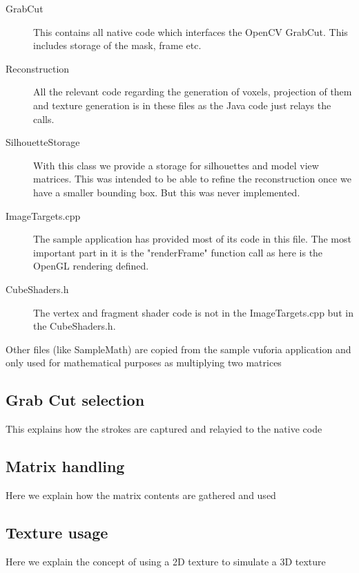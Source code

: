 \documentclass[10pt,twocolumn,letterpaper]{article}
\begin{document}
\begin{description}
	\item[GrabCut] This contains all native code which interfaces the OpenCV GrabCut. This includes storage of the mask, frame etc.
	\item[Reconstruction] All the relevant code regarding the generation of voxels, projection of them and texture generation is in these files as the Java code just relays the calls.
	\item[SilhouetteStorage] With this class we provide a storage for silhouettes and model view matrices. This was intended to be able to refine the reconstruction once we have a smaller bounding box. But this was never implemented.
	\item[ImageTargets.cpp] The sample application has provided most of its code in this file. The most important part in it is the "renderFrame" function call as here is the OpenGL rendering defined.
	\item[CubeShaders.h] The vertex and fragment shader code is not in the ImageTargets.cpp but in the CubeShaders.h.
\end{description}

Other files (like SampleMath) are copied from the sample vuforia application and only used for mathematical purposes as multiplying two matrices


\subsection{Grab Cut selection}

This explains how the strokes are captured and relayied to the native code

\subsection{Matrix handling}

Here we explain how the matrix contents are gathered and used

\subsection{Texture usage}

Here we explain the concept of using a 2D texture to simulate a 3D texture
\end{document}
